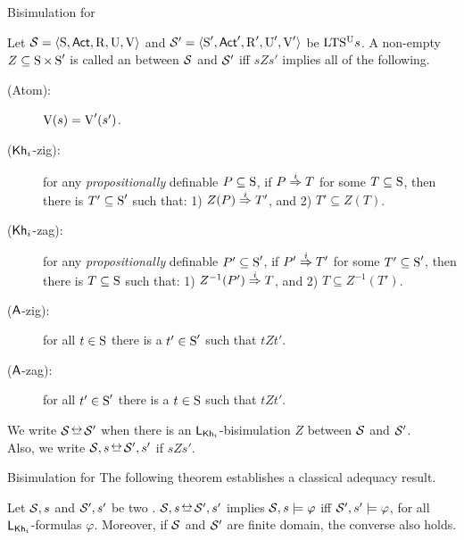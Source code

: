 \documentclass{beamer}
\begin{document}
\begin{frame}{Bisimulation for \KHilogic}
    \begin{definition}\label{def:bisim-khi}
    \begin{footnotesize}
    Let $\mathcal{S} = \langle \operatorname{S},{\rm \sf Act},\operatorname{R},\operatorname{U},\operatorname{V} \rangle$ and $\mathcal{S}' = \langle \operatorname{S}',{\rm \sf Act}',\operatorname{R}',\operatorname{U}',\operatorname{V}' \rangle$ be ${\textup{LTS$^\text{\textup{U}}$}}s$. 
    A non-empty $Z \subseteq \operatorname{S} \times \operatorname{S}'$ is called an  between $\mathcal{S}$ and $\mathcal{S}'$ iff $sZs'$ implies all of the following.
    \pause
    \begin{description} 
        \item[(Atom):] $\operatorname{V}(s)=\operatorname{V}'(s')$. \pause

        \item[(${\operatorname{\sf Kh}_i}$-zig):] for any \emph{propositionally} definable $P \subseteq \operatorname{S}$, if $P \stackrel{i}{\Rightarrow} T$ for some $T \subseteq \operatorname{S}$, then there is $T' \subseteq \operatorname{S}'$ such that: 
            1) $Z(P) \stackrel{i}{\Rightarrow} T'$, and
            2) $T' \subseteq Z(T)$. \pause

        \item[(${\operatorname{\sf Kh}_i}$-zag):] %
        for any \emph{propositionally} definable $P' \subseteq \operatorname{S}'$, if $P' \stackrel{i}{\Rightarrow} T'$ for some $T' \subseteq \operatorname{S}'$, then there is $T \subseteq \operatorname{S}$ such that: 
            1) $Z^{-1}(P') \stackrel{i}{\Rightarrow} T$, and
            2) $T \subseteq Z^{-1}(T')$. \pause

        \item[(${\operatorname{\sf A}}$-zig):] for all $t\in\operatorname{S}$ there is a $t'\in\operatorname{S}'$ such that $tZt'$. \pause

        \item[(${\operatorname{\sf A}}$-zag):] for all $t'\in\operatorname{S}'$ there is a $t\in\operatorname{S}$ such that $tZt'$. \pause
    \end{description}
    We write $\model \bisim \model'$ when there is an
    $\mathsf{L}_{\operatorname{\sf Kh}_i}$-bisimulation $Z$ between $\mathcal{S}$ and $\mathcal{S}'$. \\Also, we write $\model,s \bisim \model',s'$ if
    $sZs'$.
    \end{footnotesize}
    \end{definition}
\end{frame}


\begin{frame}{Bisimulation for \KHilogic}
The following theorem establishes a classical adequacy result. \pause

\begin{theorem}
\label{th:adequacy}
Let $\mathcal{S},s$ and $\mathcal{S}',s'$ be two \ultss. $\model,s\bisim\model',s'$ implies $\mathcal{S},s\models\varphi$ iff $\mathcal{S}',s'\models\varphi$, for all $\mathsf{L}_{\operatorname{\sf Kh}_i}$-formulas $\varphi$. Moreover, if $\mathcal{S}$ and $\mathcal{S}'$ are finite domain, the converse also holds.
\end{theorem}
\end{frame}
\end{document}

